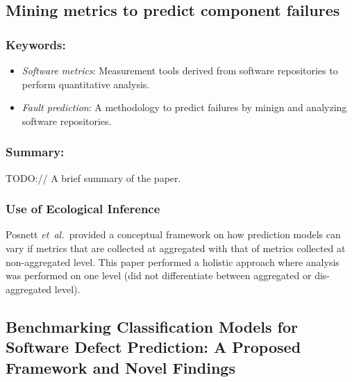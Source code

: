 \documentclass{sig-alternate-05-2015}
\newcommand{\etal}{\mbox{\emph{et al.\ }}}
\begin{document}
\subsection{Mining metrics to predict component failures \cite{Nagappan:2006}}

\subsubsection{Keywords:}
\begin{itemize}
\item \emph{Software metrics}: Measurement tools derived from software repositories to perform quantitative analysis.
\item \emph{Fault prediction}:  A methodology to predict failures by minign and analyzing software repositories.
\end{itemize} 

\subsubsection{Summary:}
TODO:// A brief summary of the paper.

\subsubsection{Use of Ecological Inference}
Posnett \etal provided a conceptual framework on how prediction models can vary if metrics that are collected at aggregated with that of metrics collected at non-aggregated level. This paper performed a holistic approach where analysis was performed on one level (did not differentiate between aggregated or dis-aggregated level).

\subsection{Benchmarking Classification Models for Software Defect Prediction: A Proposed Framework and Novel Findings \cite{Lessmann:2008}}
\end{document}
